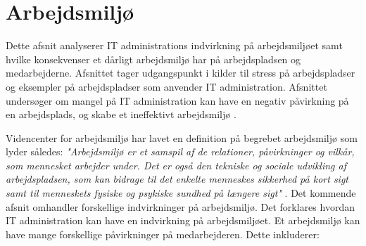 


\section{Arbejdsmiljø}
Dette afsnit analyserer IT administrations indvirkning på arbejdsmiljøet samt hvilke konsekvenser et dårligt arbejdsmiljø har på arbejdspladsen og medarbejderne. Afsnittet tager udgangspunkt i kilder til stress på arbejdspladser og eksempler på arbejdspladser som anvender IT administration. Afsnittet undersøger om mangel på IT administration kan have en negativ påvirkning på en arbejdsplads, og skabe et ineffektivt arbejdsmiljø \citep{Cambridge2011}.

Videncenter for arbejdsmiljø har lavet en definition på begrebet arbejdsmiljø som lyder således: \textit{"Arbejdsmiljø er et samspil af de relationer, påvirkninger og vilkår, som mennesket arbejder under. Det er også den tekniske og sociale udvikling af arbejdspladsen, som kan bidrage til det enkelte menneskes sikkerhed på kort sigt samt til menneskets fysiske og psykiske sundhed på længere sigt"} \citep{Arbejdsmiljoe}. Det kommende afsnit omhandler forskellige indvirkninger på arbejdsmiljø. Det forklares hvordan IT administration kan have en indvirkning på arbejdsmiljøet. Et arbejdsmiljø kan have mange forskellige påvirkninger på medarbejderen. Dette inkluderer:

